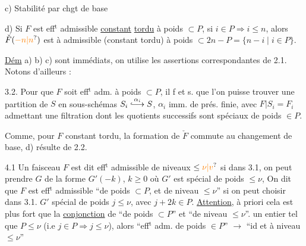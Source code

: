 c) Stabilité par chgt de base

d) Si $F$ est  eff$^{\mathrm t}$ admissible \uline{constant} \uline{tordu} à poids $\subset P$,  si $i\in P\Rightarrow i\le n$, alors $\check F(\unsure{-n|n})$ est à  admissible (constant tordu) à poids $\subset 2n-P=\{n-i\mid i\in P\}$.

\uline{Dém} \quad a) b) c) sont immédiats, on utilise les assertions correspondantes de 2.1. Notons d'ailleurs :

3.2.  Pour que $F$ soit eff$^{\mathrm t}$ adm. à poids $\subset P$, il f et s. que l'on puisse trouver une partition de $S$ en  sous-schémas $S_i\overset{\alpha_i}{\lhook\joinrel\longrightarrow} S$, $\alpha_i$ imm. de prés. finie, avec  $F|S_i=F_i$ admettant une filtration dont les quotients successifs sont spéciaux de poids $\in P$.

Comme, pour $F$ constant tordu, la formation de $\check F$ commute au changement de base,  d) résulte de 2.2.

4.1 Un faisceau $F$ est dit eff$^{\mathrm t}$ admissible  de niveaux $\le\unsure{\nu|v}$ si  dans 3.1, on peut prendre $G$  de la forme $G'(-k)$, $k\ge0$ où $G'$ est spécial de poids  $\le\nu$,  On dit que $F$ est eff$^{\mathrm t}$ admissible \textquotedblleft de poids $\subset P$, et de niveau $\le\nu$\textquotedblright{} si on peut choisir dans 3.1. $G'$  spécial de poids $j\le\nu$, avec  $j+2k\in P$. \uline{Attention}, à priori cela est plus fort que la \uline{conjonction} de \textquotedblleft de poids $\subset P$\textquotedblright{} et \textquotedblleft de niveau $\le\nu$\textquotedblright.   un entier tel que $P\le\nu$ (i.e $j\in P\Rightarrow j\le\nu$), alors \textquotedblleft eff$^{\mathrm t}$ adm. de poids $\in P$\textquotedblright{} $\to$ \textquotedblleft id et à niveau $\le\nu$\textquotedblright

